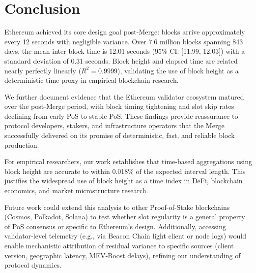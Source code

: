 \documentclass[12pt]{article}
\begin{document}
\section{Conclusion}

Ethereum achieved its core design goal post-Merge: blocks arrive approximately every 12 seconds with negligible variance. Over 7.6 million blocks spanning 843 days, the mean inter-block time is 12.01 seconds (95\% CI: [11.99, 12.03]) with a standard deviation of 0.31 seconds. Block height and elapsed time are related nearly perfectly linearly ($R^2 = 0.9999$), validating the use of block height as a deterministic time proxy in empirical blockchain research.

We further document evidence that the Ethereum validator ecosystem matured over the post-Merge period, with block timing tightening and slot skip rates declining from early PoS to stable PoS. These findings provide reassurance to protocol developers, stakers, and infrastructure operators that the Merge successfully delivered on its promise of deterministic, fast, and reliable block production.

For empirical researchers, our work establishes that time-based aggregations using block height are accurate to within 0.018\% of the expected interval length. This justifies the widespread use of block height as a time index in DeFi, blockchain economics, and market microstructure research.

Future work could extend this analysis to other Proof-of-Stake blockchains (Cosmos, Polkadot, Solana) to test whether slot regularity is a general property of PoS consensus or specific to Ethereum's design. Additionally, accessing validator-level telemetry (e.g., via Beacon Chain light client or node logs) would enable mechanistic attribution of residual variance to specific sources (client version, geographic latency, MEV-Boost delays), refining our understanding of protocol dynamics.

\newpage
\end{document}
